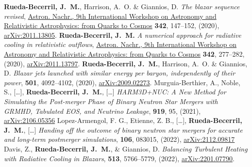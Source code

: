 \begin{thebibliography}{99}
%
 \textbf{Rueda-Becerril, J.~M.}, Harrison, A.~O. \& Giannios, D. \emph{The blazar sequence revised}, \href{https://doi.org/10.1002/asna.202113919}{Astron. Nachr., 9th International Workshop on Astronomy and Relativistic Astrophysics: from Quarks to Cosmos} \textbf{342}, 147--152, (2020), \href{https://arxiv.org/abs/2011.13805}{arXiv:2011.13805}.
%
 \textbf{Rueda-Becerril, J.~M.} \emph{A numerical approach for radiative cooling in relativistic outflows}, \href{https://doi.org/10.1002/asna.202113919}{Astron. Nachr., 9th International Workshop on Astronomy and Relativistic Astrophysics: from Quarks to Cosmos} \textbf{342}, 277--282, (2020), \href{https://arxiv.org/abs/2011.13797}{arXiv:2011.13797}.
%
 \textbf{Rueda-Becerril, J.~M.}, Harrison, A.~O. \& Giannios, D. \textit{Blazar jets launched with similar energy per baryon, independently of their power}, \href{https://doi.org/10.1093/mnras/staa3925}{\mnras} \textbf{501}, 4092--4102, (2020), \href{https://arxiv.org/abs/2009.02273}{arXiv:2009.02273}.
%
 Murguia-Berthier, A., Noble, S., [\ldots], \textbf{Rueda-Becerril, J.~M.}, [\ldots] \textit{HARM3D+NUC: A New Method for Simulating the Post-merger Phase of Binary Neutron Star Mergers with GRMHD, Tabulated EOS, and Neutrino Leakage}, \href{https://doi.org/10.3847/1538-4357/ac1119}{\apj} \textbf{919}, 95, (2021), \href{https://arxiv.org/abs/2106.05356}{arXiv:2106.05356}
%
 Lopez-Armengol, F. G., Etienne, Z. B., [\ldots], \textbf{Rueda-Becerril, J.~M.}, [\ldots] \textit{Handing off the outcome of binary neutron star mergers for accurate and long-term postmerger simulations}, \href{https://doi.org/10.1103/PhysRevD.106.083015}{\prd} \textbf{106}, 083015, (2022), \href{https://arxiv.org/abs/2112.09817}{arXiv:2112.09817}
%
 Davis, Z., \textbf{Rueda-Becerril, J.~M.}, \& Giannios, D. \textit{Balancing Turbulent Heating with Radiative Cooling in Blazars}, \href{https://doi.org/10.1093/mnras/stac1282}{\mnras} \textbf{513}, 5766--5779, (2022), \href{https://arxiv.org/abs/2201.07790}{arXiv:2201.07790}.
\end{thebibliography}





%
